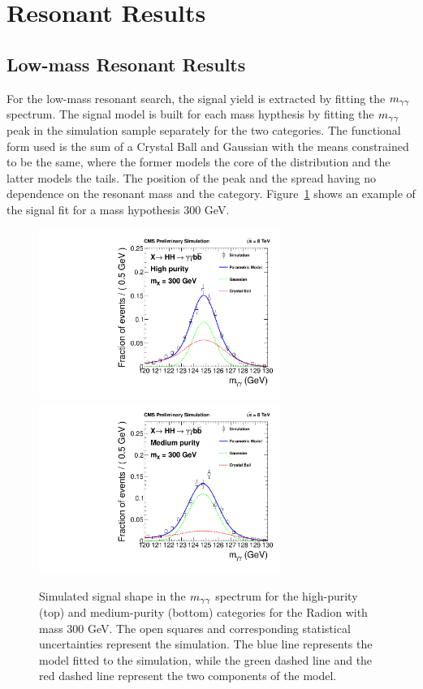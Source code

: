 \section{Resonant Results\label{sec:resresults}}

\subsection{Low-mass Resonant Results}

For the low-mass resonant search, the signal yield is extracted by fitting the $m_{\gamma\gamma}$ spectrum.
The signal model is built for each mass hypthesis by fitting the $m_{\gamma\gamma}$ peak in the simulation sample
separately for the two categories. The functional form used is the sum of a Crystal Ball and
Gaussian with the means constrained to be the same,
where the former models the core of the distribution and the latter models the
tails. The position of the peak and the spread having no dependence on the resonant mass and the
category. Figure~\ref{fig:sigfit_300} shows an example of the signal fit for a mass hypothesis 300 GeV.

\begin{figure}[ht]
 \begin{center}
   \includegraphics[width=0.70\textwidth]{figures/results/sigmodel_cat0_300.pdf}
   \includegraphics[width=0.70\textwidth]{figures/results/sigmodel_cat1_300.pdf}
 \end{center}
\caption{Simulated signal shape in the $m_{\gamma\gamma}$ spectrum for the high-purity (top) and medium-purity
(bottom) categories for the Radion with mass 300 GeV. The open squares and corresponding
statistical uncertainties represent the simulation.
The blue line represents the model fitted to the simulation, while the green dashed line
and the red dashed line represent the two components of the model.}
\label{fig:sigfit_300}
\end{figure}

